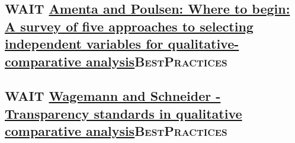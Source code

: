 \documentclass[11pt]{article}
\begin{document}
\subsection*{{\bfseries\sffamily WAIT} \href{https://doi.org/10.1177\%2F0049124194023001002}{Amenta and Poulsen: Where to begin: A survey of five approaches to selecting independent variables for  qualitative-comparative analysis}\hfill{}\textsc{BestPractices}}
\label{sec:orgbdd2af4}


\subsection*{{\bfseries\sffamily WAIT} \href{https://doi.org/10.5281/zenodo.893091}{Wagemann and Schneider - Transparency standards in qualitative comparative analysis}\hfill{}\textsc{BestPractices}}
\label{sec:orgfc2b661}
\end{document}
